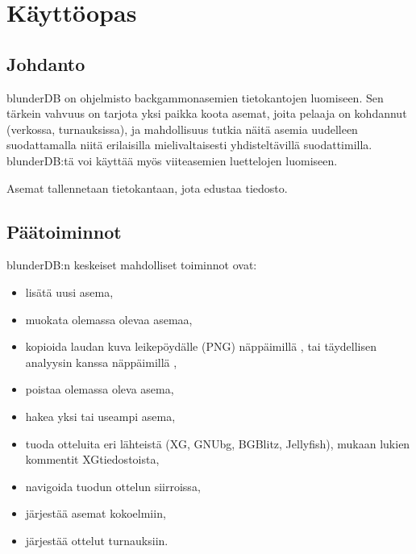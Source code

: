 \documentclass[letterpaper,10pt,finnish]{sphinxmanual}
\begin{document}
\sphinxstepscope


\section{Käyttöopas}
\label{\detokenize{manuel:manuel}}\label{\detokenize{manuel:id1}}\label{\detokenize{manuel::doc}}

\subsection{Johdanto}
\label{\detokenize{manuel:introduction}}
\sphinxAtStartPar
blunderDB on ohjelmisto backgammon\sphinxhyphen{}asemien tietokantojen luomiseen. Sen tärkein vahvuus on tarjota yksi paikka koota asemat, joita pelaaja on kohdannut (verkossa, turnauksissa), ja mahdollisuus tutkia näitä asemia uudelleen suodattamalla niitä erilaisilla mielivaltaisesti yhdisteltävillä suodattimilla. blunderDB:tä voi käyttää myös viiteasemien luettelojen luomiseen.

\sphinxAtStartPar
Asemat tallennetaan tietokantaan, jota edustaa \sphinxhyphen{}tiedosto.


\subsection{Päätoiminnot}
\label{\detokenize{manuel:interactions-principales}}
\sphinxAtStartPar
blunderDB:n keskeiset mahdolliset toiminnot ovat:
\begin{itemize}
\item {} 
\sphinxAtStartPar
lisätä uusi asema,

\item {} 
\sphinxAtStartPar
muokata olemassa olevaa asemaa,

\item {} 
\sphinxAtStartPar
kopioida laudan kuva leikepöydälle (PNG) näppäimillä , tai täydellisen analyysin kanssa näppäimillä ,

\item {} 
\sphinxAtStartPar
poistaa olemassa oleva asema,

\item {} 
\sphinxAtStartPar
hakea yksi tai useampi asema,

\item {} 
\sphinxAtStartPar
tuoda otteluita eri lähteistä (XG, GNUbg, BGBlitz, Jellyfish), mukaan lukien kommentit XG\sphinxhyphen{}tiedostoista,

\item {} 
\sphinxAtStartPar
navigoida tuodun ottelun siirroissa,

\item {} 
\sphinxAtStartPar
järjestää asemat kokoelmiin,

\item {} 
\sphinxAtStartPar
järjestää ottelut turnauksiin.

\end{itemize}
\end{document}

